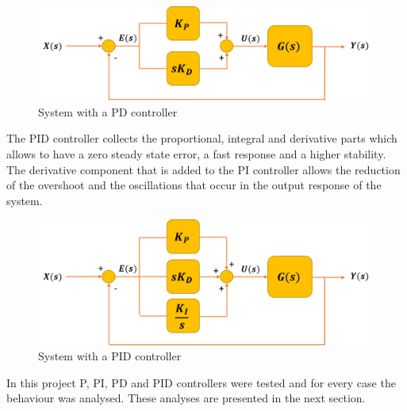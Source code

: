 \begin{figure}[H]
	\centering
	\includegraphics[scale=0.6]{figures/PD_controller.png}
	\caption{System with a PD controller}
	\label{PD_controller}
\end{figure}

\vspace{5mm}

The PID controller collects the proportional, integral and derivative parts which allows to have a zero steady state error, a fast response and a higher stability. The derivative component that is added to the PI controller allows the reduction of the overshoot and the oscillations that occur in the output response of the system. 

\begin{figure}[H]
	\centering
	\includegraphics[scale=0.6]{figures/PID_controller.png}
	\caption{System with a PID controller}
	\label{PID_controller}
\end{figure}

In this project P, PI, PD and PID controllers were tested and for every case the behaviour was analysed. These analyses are presented in the next section.